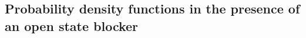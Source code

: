 \begin{comment}
If we aim for a drug that works independent of
the concentrations, we need to replace this expression by a constant value. As discussed above, the probability
density functions rapidly reach equilibrium (see Figure \ref{1D/spacetime}) and therefore we can
concentrate on the steady state solution. Let $\rho_{o,\mu}(x)$ denote
the steady state open probability density function, defined by (\ref{rho_o}). 
\K{zzz Uttrykket det refereres til ligger n\r{a} i neste kapittel. Er det greit? Det tilsvarende resultatet er nevnt i forrige kapittel i seksjon \ref{sec:analytical} for $\mu = 1$ og gitte parameterverdier.}
We use
this distribution to define the characterization%
\begin{equation}
\bar{\delta}_{o,\mu}=\frac{\mu-1}{\mu}\frac{1}{\int_{c_{0}}^{c_{+}}\rho_{o,\mu
}(x)dx}\int_{c_{0}}^{c_{+}}\rho_{o,\mu
}(x)\frac{k_{oc}(x)}{k_{co}(x)} dx. \label{open_charac}%
\end{equation} 
\K{zzz Jeg forst\r{a}r ikke hvor dette uttrykket kommer fra.}
The drug is given by the parameters $k_{ob}$ and $k_{bo}$ and they are now
related as follows,%
\begin{equation}
k_{ob}=\bar{\delta}_{o,\mu}k_{bo.} \label{kob}%
\end{equation}
In the analysis of open state blockers, we will use $k_{bo}$ as the control
parameter, and we let $k_{ob}$ be given by the relation $\left(
\ref{kob}\right) .$

\end{comment}


\subsection{Probability density functions in the presence of an open state
blocker}


